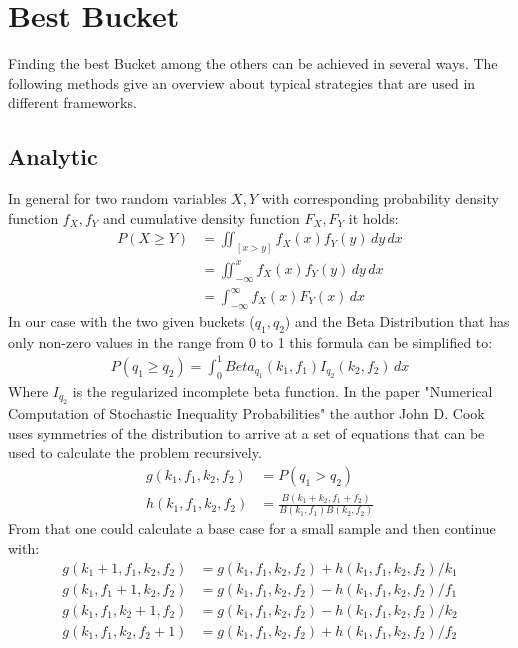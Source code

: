 \documentclass[../Thesis.tex]{subfiles}
\begin{document}
\section{Best Bucket}
Finding the best Bucket among the others can be achieved in several ways. The following methods give an overview about typical strategies that are used in different frameworks.

\subsection{Analytic}
In general for two random variables $X,Y$ with corresponding probability density function $f_X,f_Y$ and cumulative density function $F_X,F_Y$ it holds: 
\begin{align*}
P(X \geq Y ) &= \iint_{[x>y]} f_X(x)f_Y(y) \,dy\,dx \\
			 &= \iint_{-\infty}^{x} f_X(x)f_Y(y) \,dy\,dx \\
			 &= \int_{-\infty}^{\infty}f_X(x)F_Y(x)\,dx
\end{align*}
In our case with the two given buckets ($q_1,q_2$) and the Beta Distribution that has only non-zero values in the range from 0 to 1 this formula can be simplified to:
\begin{align*}
P(q_1 \geq q_2 ) = \int_{0}^{1}Beta_{q_1}(k_1,f_1)I_{q_2}(k_2,f_2)\,dx
\end{align*}
Where $I_{q_2}$ is the regularized incomplete beta function. In the paper "Numerical Computation of Stochastic Inequality Probabilities" the author John D. Cook \cite{cook2008numerical} uses symmetries of the distribution to arrive at a set of equations that can be used to calculate the problem recursively.
\begin{align*}
g(k_1,f_1,k_2,f_2) &= P(q_1>q_2) \\
h(k_1,f_1,k_2,f_2) &= \frac{B(k_1+k_2,f_1+f_2)}{B(k_1,f_1)B(k_2,f_2)}
\end{align*}
From that one could calculate a base case for a small sample and then continue with:
\begin{align*}
g(k_1 + 1,f_1,k_2,f_2) &= g(k_1,f_1,k_2,f_2) + h(k_1,f_1,k_2,f_2)/k_1 \\
g(k_1,f_1 + 1,k_2,f_2) &= g(k_1,f_1,k_2,f_2) - h(k_1,f_1,k_2,f_2)/f_1 \\
g(k_1,f_1,k_2 + 1,f_2) &= g(k_1,f_1,k_2,f_2) - h(k_1,f_1,k_2,f_2)/k_2 \\
g(k_1,f_1,k_2,f_2 + 1) &= g(k_1,f_1,k_2,f_2) + h(k_1,f_1,k_2,f_2)/f_2 \\
\end{align*}
\end{document}
